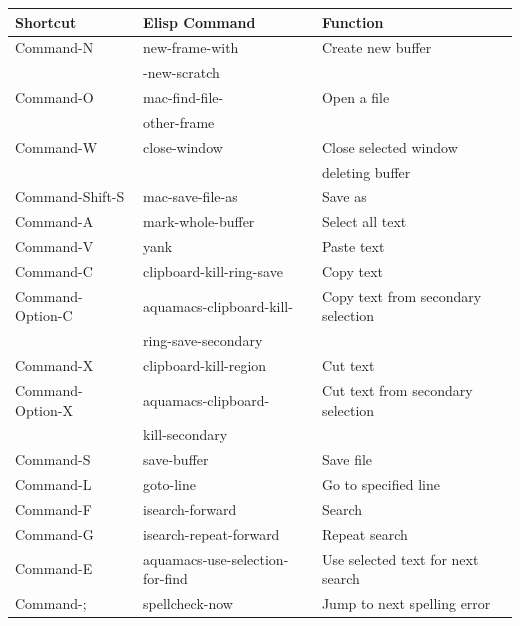 \documentclass[11pt,letterpaper]{article}
\begin{document}
\begin{table}[thp]
\begin{center}
 \begin{tabular}{|l|l|l|}
\hline  \textbf{Shortcut} &  \textbf{Elisp Command} &   \textbf{Function}\\ 

\hline Command-N &new-frame-with & Create new buffer\\ &-new-scratch & \\

\hline Command-O & mac-find-file- & Open a file\\ & other-frame & \\
\hline  Command-W &  close-window & Close selected window \\ & & deleting buffer\\

\hline Command-Shift-S & mac-save-file-as & Save as\\
 
\hline Command-A & mark-whole-buffer & Select all text\\

\hline Command-V & yank & Paste text\\

\hline Command-C & clipboard-kill-ring-save & Copy text\\
\hline Command-Option-C & aquamacs-clipboard-kill- & Copy text
from secondary selection\\ & ring-save-secondary  &\\

\hline Command-X &  clipboard-kill-region & Cut text\\
\hline Command-Option-X & aquamacs-clipboard- & Cut text
from secondary selection\\ & kill-secondary &\\

\hline Command-S &  save-buffer & Save file\\

\hline Command-L &  goto-line & Go to specified line\\

\hline Command-F & isearch-forward & Search\\

\hline Command-G &  isearch-repeat-forward & Repeat search\\
\hline Command-E & aquamacs-use-selection-for-find & Use selected text for next search\\
\hline Command-; & spellcheck-now & Jump to next spelling error\\



\end{tabular}
\end{center}
\end{table}
\end{document}
